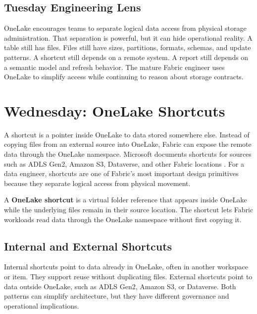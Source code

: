 \subsection{Tuesday Engineering Lens}
OneLake encourages teams to separate logical data access from physical storage administration. That separation is powerful, but it can hide operational reality. A table still has files. Files still have sizes, partitions, formats, schemas, and update patterns. A shortcut still depends on a remote system. A report still depends on a semantic model and refresh behavior. The mature Fabric engineer uses OneLake to simplify access while continuing to reason about storage contracts.

\section{Wednesday: OneLake Shortcuts}
A shortcut is a pointer inside OneLake to data stored somewhere else. Instead of copying files from an external source into OneLake, Fabric can expose the remote data through the OneLake namespace. Microsoft documents shortcuts for sources such as ADLS Gen2, Amazon S3, Dataverse, and other Fabric locations \cite{microsoftOneLakeShortcuts}. For a data engineer, shortcuts are one of Fabric's most important design primitives because they separate logical access from physical movement.

\begin{definitionbox}
A \textbf{OneLake shortcut} is a virtual folder reference that appears inside OneLake while the underlying files remain in their source location. The shortcut lets Fabric workloads read data through the OneLake namespace without first copying it.
\end{definitionbox}

\subsection{Internal and External Shortcuts}
Internal shortcuts point to data already in OneLake, often in another workspace or item. They support reuse without duplicating files. External shortcuts point to data outside OneLake, such as ADLS Gen2, Amazon S3, or Dataverse. Both patterns can simplify architecture, but they have different governance and operational implications.

